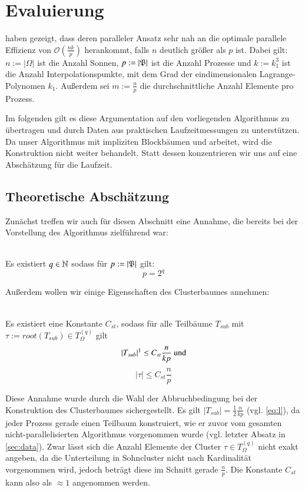 \chapter{Evaluierung}
\label{chp:Evaluation}
  \citet{distrh2} haben gezeigt, dass deren paralleler Ansatz sehr nah an die optimale parallele Effizienz von $\mathcal{O}(\frac{nk}{p})$ herankommt, falls $n$ deutlich größer als $p$ ist.
  Dabei gilt: $n := |\Omega|$ ist die Anzahl Sonnen, $p := |\mathfrak{P}|$ ist die Anzahl Prozesse und $k := k_1^3$ ist die Anzahl Interpolationspunkte, mit dem Grad der eindimensionalen Lagrange-Polynomen 
  $k_1$. Außerdem sei $m := \frac{n}{p}$ die durchschnittliche Anzahl Elemente pro Prozess.
  
  Im folgenden gilt es diese Argumentation auf den vorliegenden Algorithmus zu übertragen und durch Daten aus praktischen Laufzeitmessungen zu unterstützen. Da unser Algorithmus mit impliziten
  Blockbäumen und \hquad arbeitet, wird die Konstruktion nicht weiter behandelt. Statt dessen konzentrieren wir uns auf eine Abschätzung für die Laufzeit.
  
  \section{Theoretische Abschätzung}
  
  Zunächst treffen wir auch für diesen Abschnitt eine Annahme, die bereits bei der Vorstellung des Algorithmus zielführend war:
  \begin{ann} \ \\
  \label{ann:nodes}
    Es existiert $q \in \mathbb{N}$ sodass für $p := \left| \mathfrak{P} \right|$ gilt:
    \[ p = 2^q \]
  \end{ann}
  
  Außerdem wollen wir einige Eigenschaften des Clusterbaumes annehmen:
  
  \begin{ann} \ \\
  \label{ann:tree}
    Es existiert eine Konstante $C_{st}$, sodass für alle Teilbäume $T_{sub}$ mit $\tau := root(T_{sub}) \in T_\Omega^{(q)}$ gilt
    \[
     |T_{sub}|\footnotemark \leq C_{st} \frac{n}{kp} \text{ und}
    \]
    \[
     |\tau| \leq C_{st}\frac{n}{p}
    \]
  \end{ann}
  
  Diese Annahme wurde durch die Wahl der Abbruchbedingung bei der Konstruktion des Clusterbaumes sichergestellt. Es gilt $|T_{sub}| = \frac{1}{2} \frac{n}{kp}$ (vgl. \autoref{eq:l}),
  da jeder Prozess gerade einen Teilbaum konstruiert, wie er zuvor vom gesamten nicht-parallelisierten Algorithmus vorgenommen wurde (vgl. letzter Absatz in \autoref{sec:data}). Zwar lässt sich die
  Anzahl Elemente der Cluster $\tau \in T_\Omega^{(q)}$ nicht exakt angeben, da die Unterteilung in Sohncluster nicht nach Kardinalität vorgenommen wird, jedoch beträgt diese im Schnitt gerade 
  $\frac{n}{p}$. Die Konstante $C_{st}$ kann also als $\approx 1$ angenommen werden.
  
